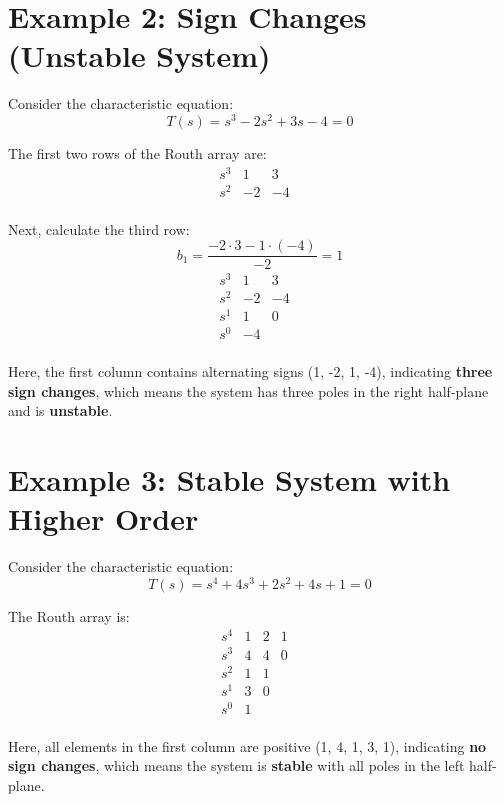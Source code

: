 \documentclass[a4paper,12pt]{article}
\begin{document}
\section{Example 2: Sign Changes (Unstable System)}

Consider the characteristic equation:
\begin{equation}
T(s) = s^3 - 2s^2 + 3s - 4 = 0
\end{equation}

The first two rows of the Routh array are:
\[
\begin{array}{c|ccc}
s^3 & 1 & 3 & \\
s^2 & -2 & -4 & \\
\end{array}
\]

Next, calculate the third row:
\[
b_1 = \frac{-2 \cdot 3 - 1 \cdot (-4)}{-2} = 1
\]
\[
\begin{array}{c|ccc}
s^3 & 1 & 3 & \\
s^2 & -2 & -4 & \\
s^1 & 1 & 0 & \\
s^0 & -4 & & \\
\end{array}
\]

Here, the first column contains alternating signs (1, -2, 1, -4), indicating \textbf{three sign changes}, which means the system has three poles in the right half-plane and is \textbf{unstable}.

\section{Example 3: Stable System with Higher Order}

Consider the characteristic equation:
\begin{equation}
T(s) = s^4 + 4s^3 + 2s^2 + 4s + 1 = 0
\end{equation}

The Routh array is:
\[
\begin{array}{c|cccc}
s^4 & 1 & 2 & 1 & \\
s^3 & 4 & 4 & 0 & \\
s^2 & 1 & 1 & & \\
s^1 & 3 & 0 & & \\
s^0 & 1 & & & \\
\end{array}
\]

Here, all elements in the first column are positive (1, 4, 1, 3, 1), indicating \textbf{no sign changes}, which means the system is \textbf{stable} with all poles in the left half-plane.
\end{document}
